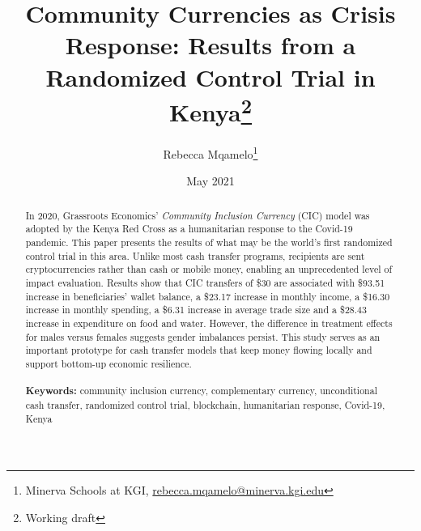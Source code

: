 \documentclass[12pt]{article}
\begin{document}
\begin{titlepage}
\title{Community Currencies as Crisis Response: Results from a Randomized Control Trial in Kenya\thanks{Working draft}}
\author{Rebecca Mqamelo\thanks{Minerva Schools at KGI, \href{mailto:rebecca.mqamelo@minerva.kgi.edu}{rebecca.mqamelo@minerva.kgi.edu}}}
\date{May 2021}
\maketitle
\begin{abstract}
\noindent In 2020, Grassroots Economics’ \textit{Community Inclusion Currency} (CIC) model was adopted by the Kenya Red Cross as a humanitarian response to the Covid-19 pandemic. This paper presents the results of what may be the world’s first randomized control trial in this area. Unlike most cash transfer programs, recipients are sent cryptocurrencies rather than cash or mobile money, enabling an unprecedented level of impact evaluation. Results show that CIC transfers of \$30 are associated with \$93.51 increase in beneficiaries' wallet balance, a \$23.17 increase in monthly income, a \$16.30 increase in monthly spending, a \$6.31 increase in average trade size and a \$28.43 increase in expenditure on food and water. However, the difference in treatment effects for males versus females suggests gender imbalances persist. This study serves as an important prototype for cash transfer models that keep money flowing locally and support bottom-up economic resilience.\\
\vspace{0in}\\
\noindent\textbf{Keywords:} community inclusion currency, complementary currency, unconditional cash transfer, randomized control trial, blockchain, humanitarian response, Covid-19, Kenya\\

\bigskip
\end{abstract}
\setcounter{page}{0}
\thispagestyle{empty}
\end{titlepage}
\pagebreak \newpage




\doublespacing
\end{document}
